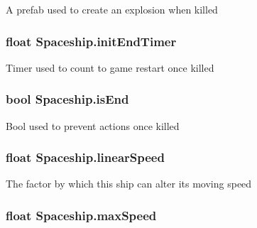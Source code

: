 A prefab used to create an explosion when killed 

\hypertarget{class_spaceship_aaad205217e2e88aabfaa4a99ed92f47c}{
\subsubsection[{init\-End\-Timer}]{\setlength{\rightskip}{0pt plus 5cm}float Spaceship.\-init\-End\-Timer\hspace{0.3cm}{\ttfamily [protected]}}}\label{class_spaceship_aaad205217e2e88aabfaa4a99ed92f47c}


Timer used to count to game restart once killed 

\hypertarget{class_spaceship_a36accc415393ff514bdc8180b3b8adb2}{
\subsubsection[{is\-End}]{\setlength{\rightskip}{0pt plus 5cm}bool Spaceship.\-is\-End\hspace{0.3cm}{\ttfamily [protected]}}}\label{class_spaceship_a36accc415393ff514bdc8180b3b8adb2}


Bool used to prevent actions once killed 

\hypertarget{class_spaceship_ab6ef069fb7cb9ab6f07849ccac8bdc00}{
\subsubsection[{linear\-Speed}]{\setlength{\rightskip}{0pt plus 5cm}float Spaceship.\-linear\-Speed\hspace{0.3cm}{\ttfamily [protected]}}}\label{class_spaceship_ab6ef069fb7cb9ab6f07849ccac8bdc00}


The factor by which this ship can alter its moving speed 

\hypertarget{class_spaceship_a55ee9bdbc21eb16afce5f0b08a751f5c}{
\subsubsection[{max\-Speed}]{\setlength{\rightskip}{0pt plus 5cm}float Spaceship.\-max\-Speed\hspace{0.3cm}{\ttfamily [protected]}}}\label{class_spaceship_a55ee9bdbc21eb16afce5f0b08a751f5c}


